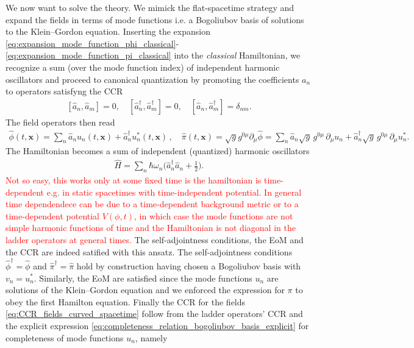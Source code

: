 \documentclass[../QFT_main.tex]{subfiles}
\begin{document}
\begin{mytheorem}
We now want to solve the theory.
We mimick the flat-spacetime strategy and expand the fields in terms of mode functions i.e. a Bogoliubov basis of solutions to the Klein--Gordon equation.
Inserting the expansion \eqref{eq:expansion_mode_function_phi_classical}-\eqref{eq:expansion_mode_function_pi_classical} into the \emph{classical} Hamiltonian, we recognize a sum (over the mode function index) of independent harmonic oscillators and proceed to canonical quantization by promoting the coefficients $a_n$ to operators satisfyng the CCR
\begin{align}\label{eq:CCR_ladder_operators}
    [\hat{a}_n, \hat{a}_m] = 0, \quad [\hat{a}_n^\dagger, \hat{a}_m^\dagger] = 0, \quad [\hat{a}_n, \hat{a}_m^\dagger] = \delta_{nm}.
\end{align}
The field operators then read
\begin{align}\label{eq:expansion_mode_function_phi_pi_quantum}
    \hat{\phi}(t,\mathbf{x}) = \sum_n \hat{a}_n u_n(t,\mathbf{x}) + \hat{a}_n^\dagger u_n^*(t,\mathbf{x})\,,\quad 
    \hat{\pi}(t,\mathbf{x}) = \sqrt{g} g^{0\mu}\partial_\mu \hat{\phi} = \sum_n \hat{a}_n \sqrt{g} \,g^{0\mu}\,\partial_\mu u_n + \hat{a}_n^\dagger \sqrt{g}\, g^{0\mu}\,\partial_\mu u_n^*.
\end{align}
The Hamiltonian becomes a sum of independent (quantized) harmonic oscillators
\begin{align}
    \hat{H} = \sum_n \hbar \omega_n \Big(\hat{a}_n^\dagger \hat{a}_n + \tfrac{1}{2}\Big).
\end{align}
\textcolor{red}{Not so easy, this works only at some fixed time is the hamiltonian is time-dependent e.g. in static spacetimes with time-independent potential. In general time dependendece can be due to a time-dependent background metric or to a time-dependent potential $V(\phi,t)$, in which case the mode functions are not simple harmonic functions of time and the Hamiltonian is not diagonal in the ladder operators at general times.}
%
The self-adjointness conditions, the EoM and the CCR are indeed satified with this ansatz.
The self-adjointness conditions $\hat{\phi}^\dagger = \hat{\phi}$ and $\hat{\pi}^\dagger = \hat{\pi}$ hold by construction having chosen a Bogoliubov basis with $v_n = u_n^*$.
Similarly, the EoM are satisfied since the mode functions $u_n$ are solutions of the Klein--Gordon equation and we enforced the expression for $\pi$ to obey the first Hamilton equation.
Finally the CCR for the fields \eqref{eq:CCR_fields_curved_spacetime} follow from the ladder operators' CCR and the explicit expression \eqref{eq:completeness_relation_bogoliubov_basis_explicit} for completeness of mode functions $u_n$, namely

\end{mytheorem}
\end{document}
